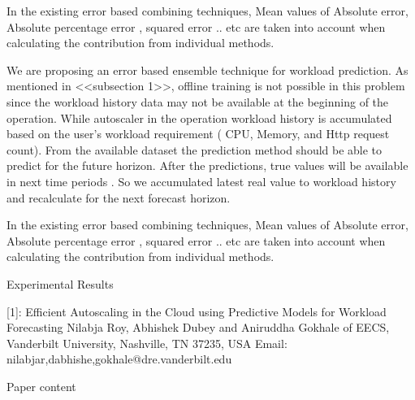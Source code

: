     In the existing error based combining techniques, Mean values of Absolute error, Absolute percentage error , 
squared error .. etc are taken into account when calculating the contribution from individual methods. 


We are proposing an error based ensemble technique for workload prediction. As mentioned in <<subsection 1>>, offline training is not possible in this problem since the  workload history data may not be available at the beginning of the operation. While autoscaler in the operation workload history  is accumulated based on the user's workload requirement ( CPU, Memory, and Http request count). From the available dataset the prediction method should be able to predict for the future horizon. After the predictions, true values will be available in next time periods . So we accumulated latest real value to workload history and recalculate for the next forecast horizon. 
		
	In the existing error based combining techniques, Mean values of Absolute error, Absolute percentage error , squared error .. etc are taken into account when calculating the contribution from individual methods. 






Experimental Results









[1]: Efficient Autoscaling in the Cloud using Predictive Models for Workload Forecasting
Nilabja Roy, Abhishek Dubey and Aniruddha Gokhale
 of EECS, Vanderbilt University, Nashville, TN 37235, USA
Email: {nilabjar,dabhishe,gokhale}@dre.vanderbilt.edu














Paper content

